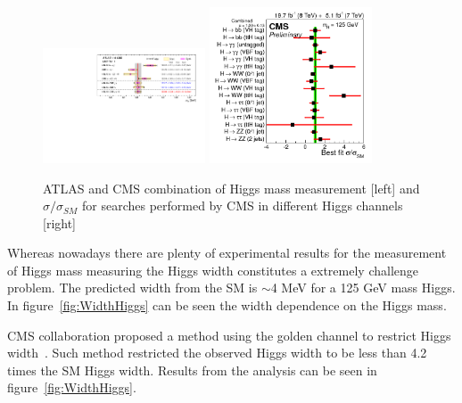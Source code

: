 \begin{figure}[!Hhtbp]
  \begin{center}
    \includegraphics[trim=10cm 7cm 1cm 1cm, clip=true, width=0.43\textwidth]{figs/LHC_combined_obs_unblind_summary_a1_final.png}
    \includegraphics[width=0.43\textwidth]{figs/sqr_mlz_ccc_mH125.png}
    \caption{ATLAS and CMS combination of Higgs mass measurement [left] and $\sigma/\sigma_{SM}$ for searches performed by CMS in different Higgs channels [right]}
    \label{fig:HiggsMass}
  \end{center}
\end{figure}

Whereas nowadays there are plenty of experimental results for the measurement of Higgs mass measuring the Higgs width constitutes a extremely challenge problem. The predicted width from the SM is $\sim$4 MeV for a 125 GeV mass Higgs. In figure~\ref{fig:WidthHiggs} can be seen the width dependence on the Higgs mass. 

CMS collaboration proposed a method using the golden channel to restrict Higgs width~\cite{CMS-PAS-HIG-14-002}. Such method restricted the observed Higgs width to be less than 4.2 times the SM Higgs width. Results from the analysis can be seen in figure~\ref{fig:WidthHiggs}.

